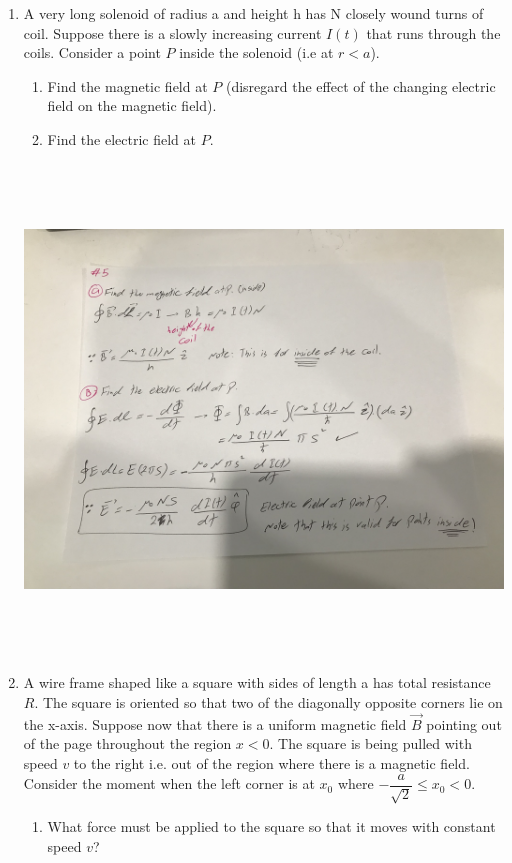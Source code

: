 \documentclass[fleqn]{article}
\begin{document}
\begin{enumerate}
    \pagebreak

    \item A very long solenoid of radius a and height h has N closely wound turns of coil. Suppose there is a 
    slowly increasing current $I(t)$ that runs through the coils. Consider a point $P$ inside the solenoid 
    (i.e at $r < a$).
    \begin{enumerate}
      \item Find the magnetic field at $P$ (disregard the effect of the changing
      electric field on the magnetic field).

      \item Find the electric field at $P$.
    \end{enumerate}

    \includegraphics[height=13cm, width=15cm]{5.jpg}

    \pagebreak


    \item A wire frame shaped like a square with sides of length a has total resistance $R$. The square is oriented 
    so that two of the diagonally opposite corners lie on the x-axis. Suppose now that there is a uniform
    magnetic field $\overrightarrow{B}$ pointing out of the page throughout the region $x < 0$. The square is being 
    pulled with speed $v$ to the right i.e. out of the region where there is a magnetic field. Consider the moment 
    when the left corner is at $x_0$ where $-\dfrac{a}{\sqrt{2}} \leq x_0 <0$.
    \begin{enumerate}
      \item What force must be applied to the square so that it moves with
      constant speed $v$?


\end{enumerate}
\end{enumerate}
\end{document}
